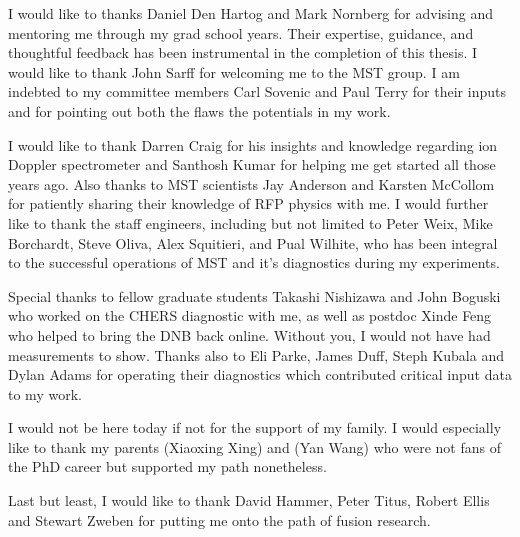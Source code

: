 

I would like to thanks Daniel Den Hartog and Mark Nornberg for advising and mentoring me through my grad school years. Their expertise, guidance, and thoughtful feedback has been instrumental in the completion of this thesis. I would like to thank John Sarff for welcoming me to the MST group. I am indebted to my committee members Carl Sovenic and Paul Terry for their inputs and for pointing out both the flaws the potentials in my work.

I would like to thank Darren Craig for his insights and knowledge regarding ion Doppler spectrometer and Santhosh Kumar for helping me get started all those years ago. Also thanks to MST scientists Jay Anderson and Karsten McCollom for patiently sharing their knowledge of RFP physics with me. I would further like to thank the staff engineers, including but not limited to Peter Weix, Mike Borchardt, Steve Oliva, Alex Squitieri, and Pual Wilhite, who has been integral to the successful operations of MST and it's diagnostics during my experiments.

Special thanks to fellow graduate students Takashi Nishizawa and John Boguski who worked on the CHERS diagnostic with me, as well as postdoc Xinde Feng who helped to bring the DNB back online. Without you, I would not have had measurements to show. Thanks also to Eli Parke, James Duff, Steph Kubala and Dylan Adams for operating their diagnostics which contributed critical input data to my work.
\begin{CJK*}{UTF8}{gbsn}

I would not be here today if not for the support of my family. I would especially like to thank my parents (Xiaoxing Xing) and (Yan Wang) who were not fans of the PhD career but supported my path nonetheless. 

\end{CJK*}

Last but least, I would like to thank David Hammer, Peter Titus, Robert Ellis and Stewart Zweben for putting me onto the path of fusion research. 

\clearpage